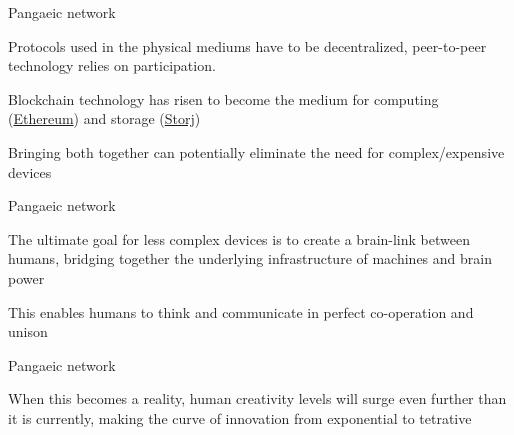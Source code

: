\documentclass[14pt]{beamer}
\begin{document}
\begin{frame}{Pangaeic network}
 \begin{fullpageitemize}
\item 
	\begin{center}
Protocols used in the physical mediums have to be decentralized, peer-to-peer technology relies on participation.
    \end{center}
\item 
	\begin{center}
Blockchain technology has risen to become the medium for computing (\href{https://www.ethereum.org/}{Ethereum}) and storage (\href{https://storj.io/}{Storj})
    \end{center}
\item 
	\begin{center}
Bringing both together can potentially eliminate the need for complex/expensive devices
    \end{center}

 \end{fullpageitemize}
\end{frame}

\begin{frame}{Pangaeic network}
 \begin{fullpageitemize}
\item 
	\begin{center}
The ultimate goal for less complex devices is to create a brain-link between humans, bridging together the underlying infrastructure of machines and brain power
    \end{center}
\item 
	\begin{center}
This enables humans to think and communicate in perfect co-operation and unison
    \end{center}

 \end{fullpageitemize}
\end{frame}

\begin{frame}{Pangaeic network}
 \begin{fullpageitemize}
\item 
	\begin{center}
When this becomes a reality, human creativity levels will surge even further than it is currently, making the curve of innovation from exponential to tetrative
    \end{center}
 \end{fullpageitemize}
\end{frame}
\end{document}
